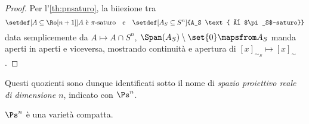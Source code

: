 \begin{proof}
	Per l'\autoref{th:pnsaturo}, la biiezione tra
	\[\setdef[A \subseteq {\Ro[n+1]} ]{A \text{ è $\pi$-saturo}} \quad\text{e}\quad
	\setdef[A_S\subseteq S^n]{A_S \text{ è $\pi_S$-saturo}}\]
	data semplicemente da $A\mapsto A\cap S^n$, $\Span(A_S)\setminus \set{0} \mapsfrom A_S$
	manda aperti in aperti e viceversa,
	mostrando continuità e apertura di $[x]_{\sim_S}  \mapsto  [x]_\sim$.
\end{proof}

\begin{defn}
	Questi quozienti sono dunque identificati sotto il nome di 
	\emph{spazio proiettivo reale di dimensione $n$}, indicato con $\Ps^n$.
\end{defn}

\begin{prop}
	$\Ps^n$ è una varietà compatta.
\end{prop}

